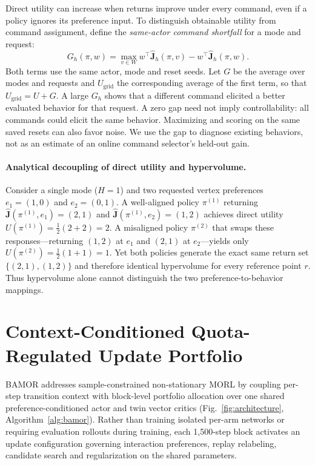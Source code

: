 Direct utility can increase when returns improve under every command, even
if a policy ignores its preference input. To distinguish obtainable utility
from command assignment, define the \emph{same-actor command shortfall}
for a mode and request:
\begin{equation}
 G_h(\pi,w) = \max_{v\in W} w^\top \widehat{\mathbf{J}}_h(\pi,v)
                   - w^\top \widehat{\mathbf{J}}_h(\pi,w).
 \label{eq:command_gap}
\end{equation}
Both terms use the same actor, mode and reset seeds. Let $G$ be the average
over modes and requests and $U_{\mathrm{grid}}$ the corresponding average of
the first term, so that $U_{\mathrm{grid}}=U+G$. A large $G_h$ shows that a
different command elicited a better evaluated behavior for that request.
A zero gap need not imply controllability: all commands could elicit the
same behavior. Maximizing and scoring on the same saved resets can also
favor noise. We use the gap to diagnose existing behaviors, not as an
estimate of an online command selector's held-out gain.

\paragraph{Analytical decoupling of direct utility and hypervolume.}
Consider a single mode ($H=1$) and two requested vertex preferences
$e_1 = (1,0)$ and $e_2 = (0,1)$. A well-aligned policy $\pi^{(1)}$ returning
$\widehat{\mathbf{J}}(\pi^{(1)}, e_1) = (2,1)$ and
$\widehat{\mathbf{J}}(\pi^{(1)}, e_2) = (1,2)$ achieves direct utility
$U(\pi^{(1)}) = \frac{1}{2}(2 + 2) = 2$. A misaligned policy $\pi^{(2)}$ that
swaps these responses—returning $(1,2)$ at $e_1$ and $(2,1)$ at $e_2$—yields
only $U(\pi^{(2)}) = \frac{1}{2}(1 + 1) = 1$. Yet both policies generate the
exact same return set $\{(2,1), (1,2)\}$ and therefore identical hypervolume
for every reference point $r$. Thus hypervolume alone cannot distinguish the
two preference-to-behavior mappings.

\section{Context-Conditioned Quota-Regulated Update Portfolio}
\label{sec:method}
\label{sec:method_v23}

BAMOR addresses sample-constrained non-stationary MORL by coupling per-step
transition context with block-level portfolio allocation over one shared
preference-conditioned actor and twin vector critics
(Fig.~\ref{fig:architecture}, Algorithm~\ref{alg:bamor}). Rather than training
isolated per-arm networks or requiring evaluation rollouts during training,
each 1,500-step block activates an update configuration governing interaction
preferences, replay relabeling, candidate search and regularization on the
shared parameters.


